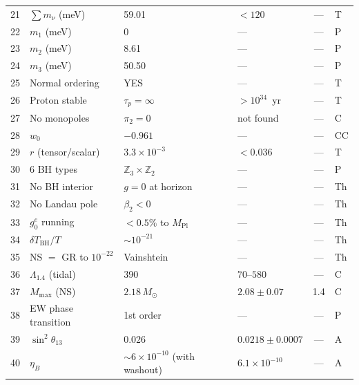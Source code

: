 \documentclass[aps,prd,twocolumn,superscriptaddress,showpacs,
  nofootinbib,floatfix,longbibliography]{revtex4-2}
\newcommand{\gone}{{g_0^e}}
\newcommand{\MP}{M_\mathrm{Pl}}
\newcommand{\ZZ}{\mathbb{Z}}
\begin{document}
\begin{table}[tp]
\begin{ruledtabular}
\begin{tabular}{rlllcl}
21 & $\sum m_\nu$ (meV) & 59.01 & $< 120$ & --- & T \\
22 & $m_1$ (meV) & 0 & --- & --- & P \\
23 & $m_2$ (meV) & 8.61 & --- & --- & P \\
24 & $m_3$ (meV) & 50.50 & --- & --- & P \\
25 & Normal ordering & YES & --- & --- & T \\
26 & Proton stable & $\tau_p = \infty$ & $> 10^{34}$~yr & --- & T \\
27 & No monopoles & $\pi_2 = 0$ & not found & --- & C \\
28 & $w_0$ & $-0.961$ & --- & --- & CC \\
29 & $r$ (tensor/scalar) & $3.3 \times 10^{-3}$ & $< 0.036$ & --- & T \\
30 & 6 BH types & $\ZZ_3 \times \ZZ_2$ & --- & --- & P \\
31 & No BH interior & $g = 0$ at horizon & --- & --- & Th \\
32 & No Landau pole & $\beta_2 < 0$ & --- & --- & Th \\
33 & $\gone$ running & $< 0.5\%$ to $\MP$ & --- & --- & Th \\
34 & $\delta T_\mathrm{BH}/T$ & $\sim 10^{-21}$ & --- & --- & Th \\
35 & NS $= $ GR to $10^{-22}$ & Vainshtein & --- & --- & Th \\
36 & $\Lambda_{1.4}$ (tidal) & 390 & $70$--$580$ & --- & C \\
37 & $M_\mathrm{max}$ (NS) & $2.18\,M_\odot$ & $2.08 \pm 0.07$ & 1.4 & C \\
38 & EW phase transition & 1st order & --- & --- & P \\
39 & $\sin^2\theta_{13}$ & 0.026 & $0.0218 \pm 0.0007$ & --- & A \\
40 & $\eta_B$ & $\sim 6 \times 10^{-10}$ (with washout) & $6.1 \times 10^{-10}$ & --- & A \\
\end{tabular}
\end{ruledtabular}
\end{table}
\end{document}

